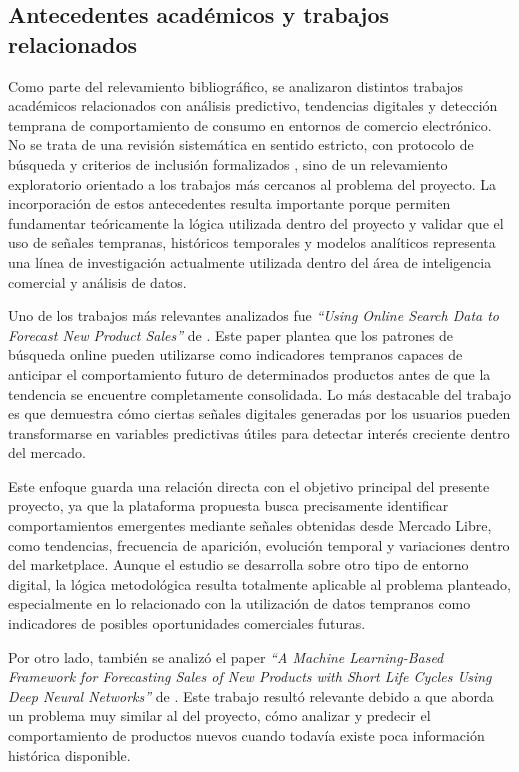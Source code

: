 \subsection{Antecedentes académicos y trabajos relacionados}

Como parte del relevamiento bibliográfico, se analizaron distintos trabajos académicos relacionados con análisis predictivo, tendencias digitales y detección temprana de comportamiento de consumo en entornos de comercio electrónico. No se trata de una revisión sistemática en sentido estricto, con protocolo de búsqueda y criterios de inclusión formalizados \parencite{KitchenhamCharters2007}, sino de un relevamiento exploratorio orientado a los trabajos más cercanos al problema del proyecto. La incorporación de estos antecedentes resulta importante porque permiten fundamentar teóricamente la lógica utilizada dentro del proyecto y validar que el uso de señales tempranas, históricos temporales y modelos analíticos representa una línea de investigación actualmente utilizada dentro del área de inteligencia comercial y análisis de datos.

Uno de los trabajos más relevantes analizados fue \emph{``Using Online Search Data to Forecast New Product Sales''} de \textcite{KulkarniKannanMoe2012}. Este paper plantea que los patrones de búsqueda online pueden utilizarse como indicadores tempranos capaces de anticipar el comportamiento futuro de determinados productos antes de que la tendencia se encuentre completamente consolidada. Lo más destacable del trabajo es que demuestra cómo ciertas señales digitales generadas por los usuarios pueden transformarse en variables predictivas útiles para detectar interés creciente dentro del mercado.

Este enfoque guarda una relación directa con el objetivo principal del presente proyecto, ya que la plataforma propuesta busca precisamente identificar comportamientos emergentes mediante señales obtenidas desde Mercado Libre, como tendencias, frecuencia de aparición, evolución temporal y variaciones dentro del marketplace. Aunque el estudio se desarrolla sobre otro tipo de entorno digital, la lógica metodológica resulta totalmente aplicable al problema planteado, especialmente en lo relacionado con la utilización de datos tempranos como indicadores de posibles oportunidades comerciales futuras.

Por otro lado, también se analizó el paper \emph{``A Machine Learning-Based Framework for Forecasting Sales of New Products with Short Life Cycles Using Deep Neural Networks''} de \textcite{ElalemMaierSeifert2023}. Este trabajo resultó relevante debido a que aborda un problema muy similar al del proyecto, cómo analizar y predecir el comportamiento de productos nuevos cuando todavía existe poca información histórica disponible.

